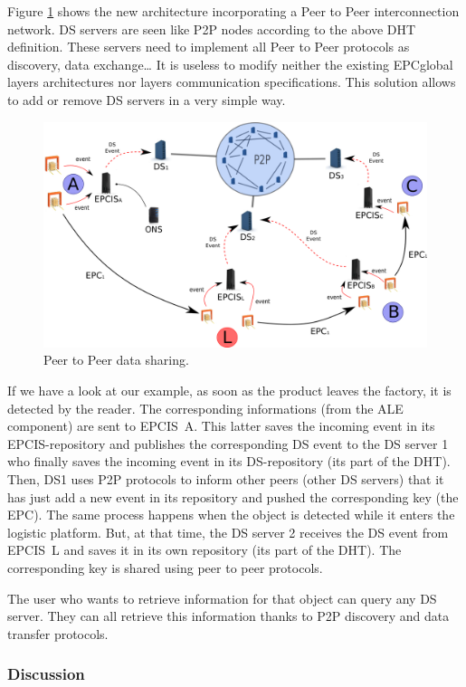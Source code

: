 \documentclass[a4paper]{llncs}
\begin{document}
Figure \ref{P2P} shows the new architecture incorporating a Peer to Peer interconnection network. DS
servers are seen like P2P nodes according to the above DHT definition. These servers need to
implement all Peer to Peer protocols as discovery, data exchange\ldots{} It is useless to modify
neither the existing EPCglobal layers architectures nor layers communication specifications. This
solution allows to add or remove DS servers in a very simple way.

\begin{figure}[htb]
\centering
\includegraphics[width=.8\textwidth]{img/p2p.png}
\caption{Peer to Peer data sharing.}
\label{P2P}
\end{figure}

If we have a look at our example, as soon as the product leaves the factory, it is detected by the
reader. The corresponding informations (from the ALE component) are sent to EPCIS~A. This latter
saves the incoming event in its EPCIS-repository and publishes the corresponding DS event to the DS
server 1 who finally saves the incoming event in its DS-repository (its part of the DHT). Then, DS1
uses P2P protocols to inform other peers (other DS servers) that it has just add a new event in its
repository and pushed the corresponding key (the EPC). The same process happens when the object is
detected while it enters the logistic platform. But, at that time, the DS server 2 receives the DS
event from EPCIS~L and saves it in its own repository (its part of the DHT). The corresponding key
is shared using peer to peer protocols.

The user who wants to retrieve information for that object can query any DS server. They can all
retrieve this information thanks to P2P discovery and data transfer protocols.

\subsubsection{Discussion}
\end{document}
